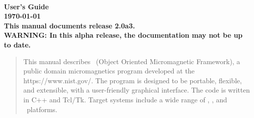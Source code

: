 
\usepackage{l2hbugs}

%
%
%
\usepackage{tocloft}
\newlength{\oommftocsslen}
\setlength{\oommftocsslen}{0.5em} %
\renewcommand{\cftsubsecpresnum}{\hfill} %
\renewcommand{\cftsubsecaftersnum}{\hspace*{\oommftocsslen}}
\addtolength{\cftsubsecnumwidth}{\oommftocsslen}
%
%




\nocite{*}  %


\begin{titlepage}
\label{page:contents}
\par
\vspace*{\fill}
\begin{center}
\Large\bf
\OOMMF\\
User's Guide\\[2ex]
\large
{\today}
{}\\[2ex]
This manual documents release 2.0a3.\\[1ex]
WARNING: In this alpha release, the
documentation may not be up to date.

\end{center}
\vspace{10\baselineskip}
\begin{abstract}
This manual describes \OOMMF\ (Object Oriented Micromagnetic Framework),
a public domain micromagnetics program developed at the
{https://www.nist.gov/}.  The program is designed
to be portable, flexible, and extensible, with a user-friendly graphical
interface.  The code is written in C++ and Tcl/Tk. Target systems
include a wide range of \Unix, \Windows, and \MacOSX\ platforms.
\end{abstract}
\vspace*{\fill}
\par
\end{titlepage}

